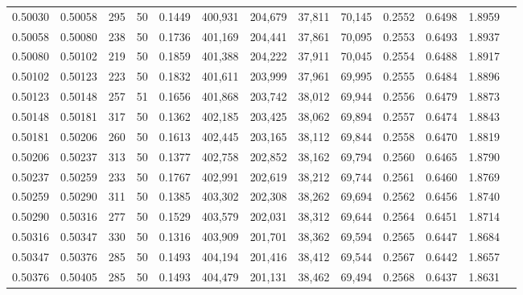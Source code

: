 \begin{tabular}{rrrrrrrrrrrrr}
0.50030 & 0.50058 &   295 &  50 &                                     0.1449 & 400,931 & 204,679 &  37,811 &  70,145 & 0.2552 & 0.6498 & 1.8959 \\
0.50058 & 0.50080 &   238 &  50 &                                     0.1736 & 401,169 & 204,441 &  37,861 &  70,095 & 0.2553 & 0.6493 & 1.8937 \\
0.50080 & 0.50102 &   219 &  50 &                                     0.1859 & 401,388 & 204,222 &  37,911 &  70,045 & 0.2554 & 0.6488 & 1.8917 \\
0.50102 & 0.50123 &   223 &  50 &                                     0.1832 & 401,611 & 203,999 &  37,961 &  69,995 & 0.2555 & 0.6484 & 1.8896 \\
0.50123 & 0.50148 &   257 &  51 &                                     0.1656 & 401,868 & 203,742 &  38,012 &  69,944 & 0.2556 & 0.6479 & 1.8873 \\
0.50148 & 0.50181 &   317 &  50 &                                     0.1362 & 402,185 & 203,425 &  38,062 &  69,894 & 0.2557 & 0.6474 & 1.8843 \\
0.50181 & 0.50206 &   260 &  50 &                                     0.1613 & 402,445 & 203,165 &  38,112 &  69,844 & 0.2558 & 0.6470 & 1.8819 \\
0.50206 & 0.50237 &   313 &  50 &                                     0.1377 & 402,758 & 202,852 &  38,162 &  69,794 & 0.2560 & 0.6465 & 1.8790 \\
0.50237 & 0.50259 &   233 &  50 &                                     0.1767 & 402,991 & 202,619 &  38,212 &  69,744 & 0.2561 & 0.6460 & 1.8769 \\
0.50259 & 0.50290 &   311 &  50 &                                     0.1385 & 403,302 & 202,308 &  38,262 &  69,694 & 0.2562 & 0.6456 & 1.8740 \\
0.50290 & 0.50316 &   277 &  50 &                                     0.1529 & 403,579 & 202,031 &  38,312 &  69,644 & 0.2564 & 0.6451 & 1.8714 \\
0.50316 & 0.50347 &   330 &  50 &                                     0.1316 & 403,909 & 201,701 &  38,362 &  69,594 & 0.2565 & 0.6447 & 1.8684 \\
0.50347 & 0.50376 &   285 &  50 &                                     0.1493 & 404,194 & 201,416 &  38,412 &  69,544 & 0.2567 & 0.6442 & 1.8657 \\
0.50376 & 0.50405 &   285 &  50 &                                     0.1493 & 404,479 & 201,131 &  38,462 &  69,494 & 0.2568 & 0.6437 & 1.8631 \\

\end{tabular}
